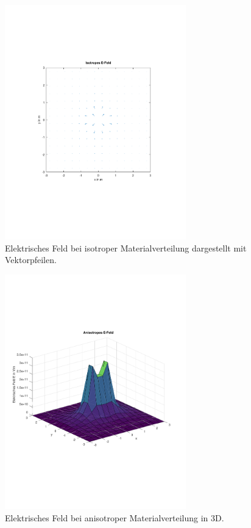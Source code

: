 \documentclass[Protokollheft.tex]{subfiles}
\begin{document}
\begin{figure}[h!]
	\centering
	\includegraphics[trim = 10mm 60mm 10mm 50mm, clip, width=0.7\textwidth]{efield_2.pdf}
	\caption{Elektrisches Feld bei isotroper Materialverteilung dargestellt mit Vektorpfeilen.}
	\label{Abb:62}
\end{figure}
\begin{figure}[h!]
	\centering
	\includegraphics[trim = 10mm 60mm 10mm 50mm, clip, width=0.7\textwidth]{efield_3.pdf}
	\caption{Elektrisches Feld bei anisotroper Materialverteilung in 3D.}
	\label{Abb:71}
\end{figure}
\end{document}
